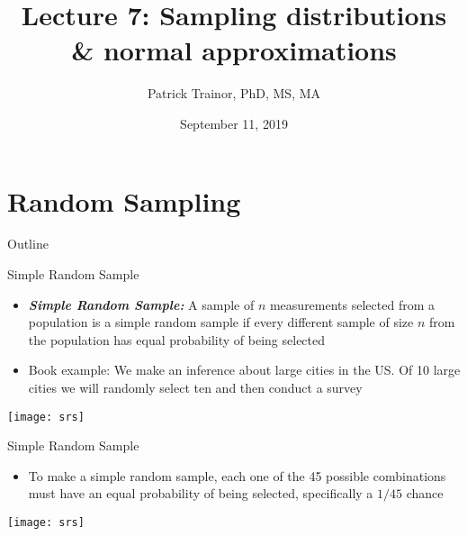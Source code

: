 \documentclass[xcolor=dvipsnames]{beamer}
\title[Lecture 7]{Lecture 7: Sampling distributions \& normal approximations}
\author[Patrick Trainor]{Patrick Trainor, PhD, MS, MA}
\institute[NMSU]{New Mexico State University}
\date{September 11, 2019}
\begin{document}
	
\begin{frame}
	\maketitle
\end{frame}
\section{Random Sampling}
\begin{frame}{Outline}
	\tableofcontents[currentsection,subsectionstyle=show/shaded/hide]
\end{frame}

\begin{frame}{Simple Random Sample}
	\begin{itemize}
		\item \textbf{\emph{Simple Random Sample:}} A sample of $n$ measurements selected from a population is a simple random sample if every different sample of size $n$ from the population has equal probability of being selected
		\item Book example: We make an inference about large cities in the US. Of 10 large cities we will randomly select ten and then conduct a survey
	\end{itemize}
	\begin{center}
		\texttt{[image: srs]}
	\end{center}
\end{frame}

\begin{frame}{Simple Random Sample}
	\begin{itemize}
		\item To make a simple random sample, each one of the 45 possible combinations must have an equal probability of being selected, specifically a $1/45$ chance
	\end{itemize}
	\begin{center}
		\texttt{[image: srs]}
	\end{center}
\end{frame}
\end{document}
